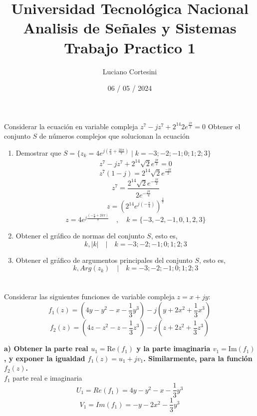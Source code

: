 \documentclass[12pt]{report}
\title{%
  \fontsize{25}{0}\selectfont Universidad Tecnológica Nacional \\
  \fontsize{22}{30}\selectfont Analisis de Señales y Sistemas \\
  \fontsize{20}{25}\selectfont Trabajo Practico 1
}
\author{Luciano Cortesini}
\date{06 / 05 / 2024}
\begin{document}
\maketitle

\chapter{}
Considerar la ecuación en variable compleja $z^7-jz^7+2^{14}2e^{\frac{j\pi}{2}}=0$
Obtener el conjunto $S$ de números complejos que solucionan la ecuación

\begin{enumerate}
  \item Demostrar que  $S = \{z_k = 4e^{j(\frac{\pi}{4}+\frac{2k\pi}{7})} \mid k=-3;-2;-1;0;1;2;3\}$
    $$z^7 - jz^7 + 2^{14}\sqrt{2}e^{\frac{j\pi}{2}} = 0$$
    $$z^7(1-j) = 2^{14}\sqrt{2}e^{\frac{-j\pi}{2}}$$
    $$z^7 = \frac{2^{14}\sqrt{2}e^{-\frac{j\pi}{2}}} {2e^{-\frac{j\pi}{4}}}$$
    $$z = (2^{14}e^{j(-\frac{\pi} {4})})^{\frac{1}{7}}$$
    $$z = 4e^{j\frac{(-\frac{\pi}{4}+2k\pi)}{7}} \quad,\quad k = \{-3,-2,-1,0,1,2,3\}$$

  \item Obtener el gráfico de normas del conjunto $S$, esto es,
    $$k, |k| \quad | \quad k = -3;-2;-1;0;1;2;3 $$

  \item Obtener el gráfico de argumentos principales del conjunto $S$, esto es,
    $$k, Arg(z_k) \quad | \quad k = -3;-2;-1;0;1;2;3 $$

\end{enumerate}

\chapter{}
Considerar las siguientes funciones de variable compleja $z = x + jy$:
$$f_1(z) = (4y - y^2 - x - \frac{1}{3}y^3) - j(y + 2x^2 + \frac{1}{3}x^3)$$
$$f_2(z) = (4z - z^2 - z - \frac{1}{3}z^3) - j(z + 2z^2 + \frac{1}{3}z^3)$$

\textbf{a) Obtener la parte real $u_1 = \text{Re}(f_1)$ y la parte imaginaria $v_1 = \text{Im}(f_1)$
, y exponer la igualdad $f_1(z) = u_1 + jv_1$. Similarmente, para la función $f_2(z)$.}\\

$f_1$ parte real e imaginaria
$$U_1=Re(f_1)=4y-y^2-x-\frac{1}{3}y^3$$
$$V_1=Im(f_1)=-y-2x^2-\frac{1}{3}y^3$$
\end{document}
